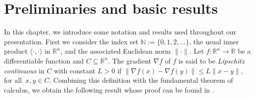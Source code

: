 \chapter{Preliminaries and basic results}  \label{chap:Prel}


In this chapter, we introduce  some notation and results used throughout our presentation.  First we  consider the  index set  ${\mathbb{N}}:=\{0,1,2,\ldots\}$,  the usual inner  product  $\langle \cdot,\cdot \rangle$ in $\mathbb{R}^n$, and the associated Euclidean norm    $\|\cdot\|$.
Let  $f:\mathbb{R}^n \to \mathbb{R}$ be a differentiable function and $C \subseteq \mathbb{R}^n$. The  gradient $\nabla f$ of $f$ is said to be {\it Lipschitz continuous} in $C$ with constant $L>0$ if $\|\nabla f(x)-\nabla f(y)\|\leq L \|x-y\|$, for all~$x, y\in C$. Combining this definition with the fundamental theorem of calculus, we obtain the following result whose proof can be found in \cite[Proposition A.24]{Bertsekas1999}.

